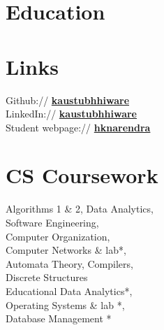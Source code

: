 \documentclass[a4paper]{deedy-resume} %
\begin{document}
\begin{minipage}[t]{0.33\textwidth} %

  \section{Education} 



  \sectionspace
  \sectionspace
  

  \sectionspace
  \sectionspace
  
    
  \sectionspace

  \section{Links} 

  Github:// \href{https://github.com/kaustubhhiware}{\bf kaustubhhiware} \\
  LinkedIn:// \href{https://www.linkedin.com/in/kaustubhhiware}{\bf kaustubhhiware} \\
  Student webpage:// \href{http://cse.iitkgp.ac.in/~hknarendra/}{\bf hknarendra} \\
  
  \sectionspace

  \section{CS Coursework}
  Algorithms 1 \& 2, Data Analytics, \\
  Software Engineering, \\
  Computer Organization, \\
  Computer Networks \& lab*, \\
  Automata Theory, Compilers, \\ 
  Discrete Structures\\
  Educational Data Analytics*, \\
  Operating Systems \& lab *,  \\
  Database Management *\\


\end{minipage}
\end{document}
